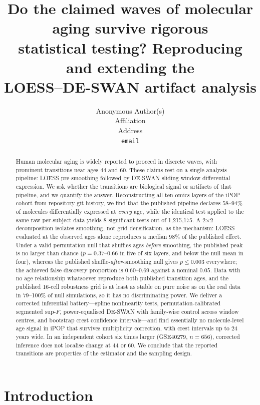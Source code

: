 \documentclass{article}
\title{Do the claimed waves of molecular aging survive rigorous\\statistical testing? Reproducing and extending the\\LOESS--DE-SWAN artifact analysis}
\author{%
  Anonymous Author(s)\\
  Affiliation\\
  Address\\
  \texttt{email}
}
\begin{document}
\maketitle

\begin{abstract}
Human molecular aging is widely reported to proceed in discrete waves, with prominent transitions near ages 44 and 60. These claims rest on a single analysis pipeline: LOESS pre-smoothing followed by DE-SWAN sliding-window differential expression. We ask whether the transitions are biological signal or artifacts of that pipeline, and we quantify the answer. Reconstructing all ten omics layers of the iPOP cohort from repository git history, we find that the published pipeline declares 58--94\% of molecules differentially expressed at \emph{every} age, while the identical test applied to the same raw per-subject data yields 8 significant tests out of 1{,}215{,}175. A 2$\times$2 decomposition isolates smoothing, not grid densification, as the mechanism: LOESS evaluated at the observed ages alone reproduces a median 98\% of the published effect. Under a valid permutation null that shuffles ages \emph{before} smoothing, the published peak is no larger than chance ($p=0.37$--$0.66$ in five of six layers, and below the null mean in four), whereas the published shuffle-\emph{after}-smoothing null gives $p\leq0.003$ everywhere; the achieved false discovery proportion is $0.60$--$0.69$ against a nominal $0.05$. Data with no age relationship whatsoever reproduce both published transition ages, and the published 16-cell robustness grid is at least as stable on pure noise as on the real data in 79--100\% of null simulations, so it has no discriminating power. We deliver a corrected inferential battery---spline nonlinearity tests, permutation-calibrated segmented sup-$F$, power-equalised DE-SWAN with family-wise control across window centres, and bootstrap crest confidence intervals---and find essentially no molecule-level age signal in iPOP that survives multiplicity correction, with crest intervals up to 24 years wide. In an independent cohort six times larger (GSE40279, $n=656$), corrected inference does not localise change at 44 or 60. We conclude that the reported transitions are properties of the estimator and the sampling design.
\end{abstract}

\section{Introduction}
\end{document}
